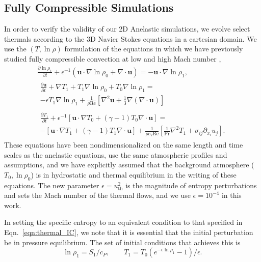 \documentclass[twocolumn, amsmath, amsfonts, amssymb, trackchanges]{aastex62}
\newcommand{\DivU}{\ensuremath{\nabla\cdot\bm{u}}}
\newcommand{\grad}{\ensuremath{\nabla}}
\begin{document}
\subsection{Fully Compressible Simulations}
In order to verify the validity of our 2D Anelastic simulations, we evolve select thermals according to the 3D Navier Stokes equations in a cartesian domain. 
We use the $(T, \ln\rho)$ formulation of the equations in which we have previously studied fully compressible convection at low and high Mach number \citep{lecoanet&all2014, anders&brown2017},
\begin{gather}
\frac{\partial \ln\rho_1}{\partial t} + \epsilon^{-1}\left(\bm{u}\cdot\grad\ln\rho_0 + \DivU\right) = -\bm{u}\cdot\grad\ln\rho_1, \\
\begin{split}
\frac{\partial \bm{u}}{\partial t}  +\grad T_1 + T_1\grad\ln\rho_0 + T_0\grad\ln\rho_1  =\\
- \epsilon T_1\grad\ln\rho_1 + \frac{1}{\rho\text{Re}}\left[\grad^2\bm{u} + \frac{1}{3}\grad(\DivU)\right]
\end{split} \\
\begin{split}
\frac{\partial T_1}{\partial t} + \epsilon^{-1}\left[\bm{u}\cdot\grad T_0 + (\gamma-1)T_0\DivU\right] = \\
-\left[\bm{u}\cdot\grad T_1 + (\gamma-1)T_1\DivU\right] + \frac{1}{\rho c_V\text{Re}}\left[\frac{1}{\text{Pr}}\grad^2 T_1 + \sigma_{ij}\partial_{x_i}u_j\right].
\end{split}
\end{gather}
These equations have been nondimensionalized on the same length and time scales as the anelastic equations, use the same atmospheric profiles and assumptions, and we have explicitly assumed that the background atmosphere ($T_0, \ln\rho_0$) is in hydrostatic and thermal equilibrium in the writing of these equations. 
The new parameter $\epsilon = u_{\text{th}}^2$ is the magnitude of entropy perturbations and sets the Mach number of the thermal flows, and we use $\epsilon = 10^{-4}$ in this work. 

In setting the specific entropy to an equivalent condition to that specified in Eqn.~\ref{eqn:thermal_IC}, we note that it is essential that the initial perturbation be in pressure equilibrium. 
The set of initial conditions that achieves this is
\begin{equation}
\ln\rho_1 = S_1/c_P, \qquad T_1 = T_0(e^{-\epsilon\ln\rho_1} - 1)/\epsilon.
\end{equation}
\end{document}
